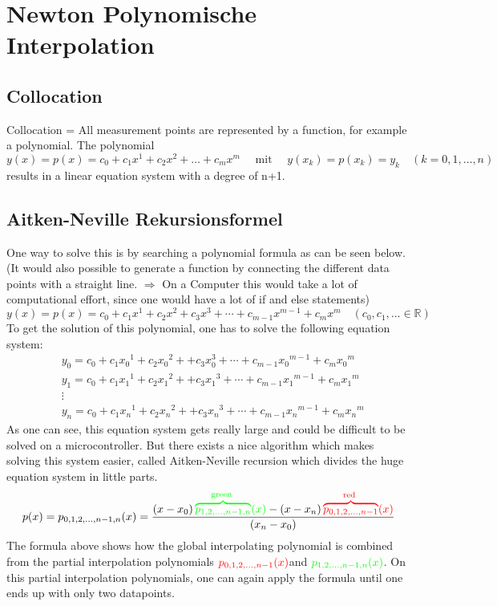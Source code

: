 \section{Newton Polynomische Interpolation}
\subsection{Collocation}
Collocation = All measurement points are represented by a function, for example a polynomial.
The polynomial
$$
y(x)=p(x)=c_{0}+c_{1} x^{1}+c_{2} x^{2}+\ldots+c_{m} x^{m} \quad \text { mit } \quad y\left(x_{k}\right)=p\left(x_{k}\right)=y_{k} \quad(k=0,1, \ldots, n)
$$
results in  a linear equation system with a degree of n+1.
\subsection{Aitken-Neville Rekursionsformel}
One way to solve this is by searching a polynomial formula as can be seen below. (It would also possible to generate a function by connecting the different data points with a straight line. $\Rightarrow$ On a Computer this would take a lot of computational effort, since one would have a lot of if and else statements)
$$
y(x)=p(x)=c_0+c_1 x^1+c_2 x^2+c_3 x^3+\cdots+c_{m-1} x^{m-1}+c_m x^m \quad\left(c_0, c_1, \ldots \in \mathbb{R}\right)
$$
To get the solution of this polynomial, one has to solve the following equation system:
$$
\begin{aligned}
&y_0=c_0+c_1 x_0{ }^1+c_2 x_0{ }^2++c_3 x_0^3+\cdots+c_{m-1} x_0{ }^{m-1}+c_m x_0{ }^m \\
&y_1=c_0+c_1 x_1{ }^1+c_2 x_1{ }^2++c_3 x_1{ }^3+\cdots+c_{m-1} x_1{ }^{m-1}+c_m x_1{ }^m \\
&\vdots \\
&y_n=c_0+c_1 x_n{ }^1+c_2 x_n{ }^2++c_3 x_n{ }^3+\cdots+c_{m-1} x_n{ }^{m-1}+c_m x_n{ }^m
\end{aligned}
$$
As one can see, this equation system gets really large and could be difficult to be solved on a microcontroller. But there exists a nice algorithm which makes solving this system easier, called Aitken-Neville recursion which divides the huge equation system in little parts.
$$
p(x)=p_{0,1,2, \ldots, n-1, n}(x)=\frac{\left(x-x_0\right) \textcolor{green}{\overbrace{p_{1,2, \ldots, n-1, n}}^{\text {green }}(x)}-\left(x-x_n\right) \textcolor{red}{\overbrace{p_{0,1,2, \ldots, n-1}}^{\text {red }}(x)}}{\left(x_n-x_0\right)}
$$
The formula above shows how the global interpolating polynomial is combined from the partial interpolation polynomials $\textcolor{red}{p_{0,1,2, \ldots, n-1}(x)}$and $\textcolor{green}{p_{1,2, \ldots, n-1, n}(x)}$. On this partial interpolation polynomials, one can again apply the formula until one ends up with only two datapoints.
